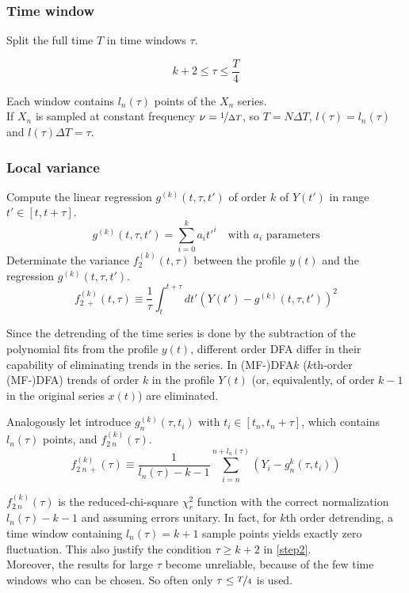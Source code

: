 \subsubsection{Time window}\label{step2}
Split the full time $T$ in time windows $\tau$.

\begin{equation}
	k+2 \le \tau \le \frac{T}{4}
\end{equation}

Each window contains $l_n(\tau)$ points of the $X_n$ series. \\
If $X_n$ is sampled at constant frequency $\nu = \nicefrac{1}{\Delta T}$, so $T = N \Delta T$, $l(\tau) = l_n(\tau)$ and $l(\tau) \Delta T = \tau $. 

\subsubsection{Local variance}\label{step3}
Compute the linear regression $ g^{( k )}(t, \tau, t') $ of order $k$ of $Y(t')$ in range $t' \in \left[t, t + \tau \right]$.
\begin{equation}
	g^{( k )}(t, \tau, t') = \sum_{i=0}^{k} a_i t'^{i} \quad \text{with $a_i$ parameters}
\end{equation}
Determinate the variance $ f_2^{( k )}( t, \tau ) $ between the profile $ y(t) $ and the regression $ g^{( k )}(t, \tau, t') $.
\begin{equation}
	f_{2 \ +}^{( k )}( t, \tau ) \equiv \frac{1}{\tau} \int_{t}^{t+\tau} dt' \left( Y( t' ) - g^{( k )}(t, \tau, t')  \right)^2
\end{equation}

Since the detrending of the time series is done by the subtraction of the polynomial fits from the profile $y(t)$, different order DFA differ in their capability of eliminating trends in the series. In (MF-)DFA$k$ ($k$th-order (MF-)DFA) trends of order $k$ in the profile $Y(t)$ (or, equivalently, of order $k-1$ in the original series $x(t)$) are eliminated. 

Analogously let introduce $g_n^{(k)}(\tau, t_i)$ with $t_i \in [t_n, t_n + \tau]$, which contains $l_n(\tau)$ points, and $f_{2\ n}^{( k )}( \tau )$.
\begin{equation}
	f_{2\ n \ +}^{( k )}( \tau ) \equiv \frac{1}{l_n(\tau) - k - 1} \sum_{i=n}^{n + l_n(\tau)} \left(Y_i - g_n^{k} (\tau, t_i) \right)
\end{equation}

$f_{2\ n}^{( k )}( \tau )$ is the reduced-chi-square $\chi^2_r$ function with the correct normalization $l_n(\tau) - k - 1$ and assuming errors unitary. In fact, for $k$th order detrending, a time window containing $l_n(\tau) = k + 1$ sample points yields exactly zero fluctuation. This also justify the condition $\tau \ge k+2$ in \autoref{step2}.\\
Moreover, the results for large $\tau$ become unreliable, because of the few time windows who can be chosen. So often only $\tau \le \nicefrac{T}{4}$ is used. 

